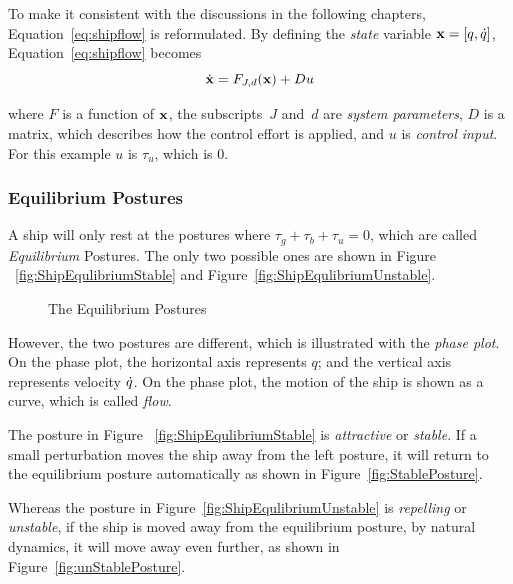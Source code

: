 To make it consistent with the discussions in the following chapters, Equation~\ref{eq:shipflow} is reformulated.
By defining the \emph{state} variable $\mathbf{x}=[q,\dot{q}]$,  Equation~\ref{eq:shipflow} becomes
\[
\dot{\mathbf{x}}=F_{J,d}(\mathbf{x})+Du
\]

where 
$F$ is a function of $\mathbf{x}$, the subscripts~$J$ and~$d$ are \emph{system parameters},
$D$ is a matrix, which describes how the control effort is applied,
and $u$ is \emph{control input}.
For this example $u$ is $\tau_{u}$, which is $0$.



\subsubsection*{Equilibrium Postures}
A ship will only rest at the postures where $\tau_{g}+\tau_{b}+\tau_{u}=0$, which are called \emph{Equilibrium} Postures.
The only two possible ones are shown in Figure ~\ref{fig:ShipEqulibriumStable} and Figure~\ref{fig:ShipEqulibriumUnstable}.
\begin{figure}[h]
\begin{center}
	
\end{center}
\caption{The Equilibrium Postures}
\label{fig:eqposture}
\end{figure}







However, the two postures are different, which is illustrated with the \emph{phase plot}.
On the phase plot, the horizontal axis represents  $q$; and the vertical axis represents velocity $\dot{q}$. 
On the phase plot, the motion of the ship is shown as a curve, which is called \emph{flow}.

The posture in Figure ~\ref{fig:ShipEqulibriumStable} is \emph{attractive} or \emph{stable}.
If a small perturbation moves the ship away from the left posture, it will return to the equilibrium posture automatically as shown in Figure~\ref{fig:StablePosture}.



Whereas the  posture in Figure~\ref{fig:ShipEqulibriumUnstable} is \emph{repelling} or \emph{unstable}, if the ship is moved away from the equilibrium posture,  by natural dynamics, it will move away even further, as shown in Figure~\ref{fig:unStablePosture}.


